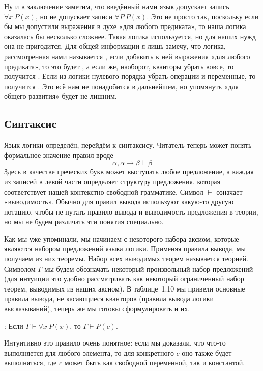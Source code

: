 Ну и в заключение заметим, что введённый нами язык допускает запись $\forall x\ P(x)$, но не допускает записи $\forall P\ P(x)$. Это не просто так, поскольку если бы мы допустили выражения в духе «для любого предиката», то наша логика оказалась бы несколько сложнее. Такая логика используется, но для наших нужд она не пригодится. Для общей информации я лишь замечу, что логика, рассмотренная нами называется , если добавить к ней выражения «для любого предиката», то это будет , а если же, наоборот, кванторы убрать вовсе, то получится . Если из логики нулевого порядка убрать операции и переменные, то получится . Это всё нам не понадобится в дальнейшем, но упомянуть «для общего развития» будет не лишним.

\subsection{Синтаксис}

Язык логики определён, перейдём к синтаксису. Читатель теперь может понять формальное значение правил вроде
$$\alpha, \alpha\to\beta \vdash \beta$$
Здесь в качестве греческих букв может выступать любое предложение, а каждая из записей в левой части определяет структуру предложения, которая соответствует нашей контекстно-свободной грамматике. Символ $\vdash$ означает «выводимость». Обычно для правил вывода  используют какую-то другую нотацию, чтобы не путать правило вывода и выводимость предложения в теории, но мы не будем различать эти понятия специально.

Как мы уже упоминали, мы начинаем с некоторого набора аксиом, которые являются набором предложений языка логики. Применяя правила вывода, мы получаем из них теоремы. Набор всех выводимых теорем называется теорией. Символом $\Gamma$ мы будем обозначать некоторый произвольный набор предложений (для интуиции это удобно рассматривать как некоторый ограниченный набор теорем, выводимых из наших аксиом). В таблице~1.10 мы привели основные правила вывода, не касающиеся кванторов (правила вывода логики высказываний), теперь же мы готовы сформулировать и их.

: Если $\Gamma \vdash \forall x\ P(x)$, то $\Gamma \vdash P(c)$.

Интуитивно это правило очень понятное: если мы доказали, что что-то выполняется для любого элемента, то для конкретного $c$ оно также будет выполняться, где $c$ может быть как свободной переменной, так и константой.

